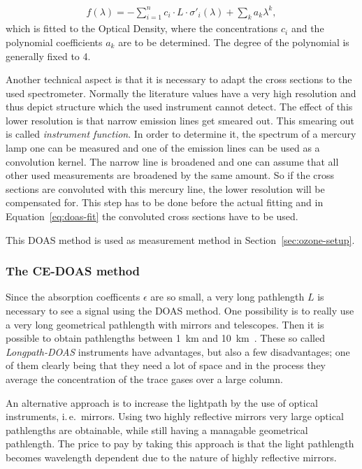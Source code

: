 \begin{align}
  f(\lambda) = - \sum_{i=1}^n c_i \cdot L \cdot \sigma'_i(\lambda) +
  \sum_k a_k \lambda^k \label{eq:doas-fit},
\end{align}
which is fitted to the Optical Density, where the concentrations $c_i$
and the polynomial coefficients $a_k$ are to be determined. The degree
of the polynomial is generally fixed to \num{4}.

Another technical aspect is that it is necessary to adapt the cross
sections to the used spectrometer. Normally the literature values have
a very high resolution and thus depict structure which the used
instrument cannot detect. The effect of this lower resolution is that
narrow emission lines get smeared out. This smearing out is called
\emph{instrument function}. In order to determine it, the spectrum of
a mercury lamp one can be measured and one of the emission lines can
be used as a convolution kernel. The narrow line is broadened and one
can assume that all other used measurements are broadened by the same
amount. So if the cross sections are convoluted with this mercury
line, the lower resolution will be compensated for. This step has to
be done before the actual fitting and in Equation~\eqref{eq:doas-fit}
the convoluted cross sections have to be used.

This DOAS method is used as measurement method in
Section~\ref{sec:ozone-setup}. 

\subsubsection{The CE-DOAS method}
\label{sec:ce-doas}

Since the absorption coefficents $\epsilon$ are so small, a very long
pathlength $L$ is necessary to see a signal using the DOAS method. One
possibility is to really use a very long geometrical pathlength with
mirrors and telescopes. Then it is possible to obtain pathlengths
between \SI{1}{\kilo\meter} and
\SI{10}{\kilo\meter}~\cite{platt}. These so called
\emph{Longpath-DOAS} instruments have advantages, but also a few
disadvantages; one of them clearly being that they need a lot of space
and in the process they average the concentration of the trace gases
over a large column.

An alternative approach is to increase the lightpath by the use of
optical instruments, i.\,e.\ mirrors. Using two highly reflective
mirrors very large optical pathlengths are obtainable, while still
having a managable geometrical pathlength. The price to pay by
taking this approach is that the light pathlength becomes
wavelength dependent due to the nature of highly reflective mirrors.

